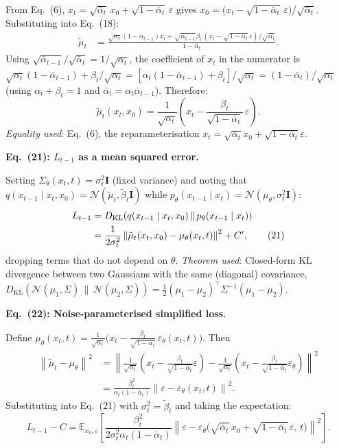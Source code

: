 \documentclass[11pt]{article}
\newcommand{\E}{\mathbb{E}}
\newcommand{\N}{\mathcal{N}}
\newcommand{\KL}[2]{D_{\mathrm{KL}}\!\left(#1\,\|\,#2\right)}
\newcommand{\norm}[1]{\left\|#1\right\|}
\newcommand{\abar}{\bar{\alpha}}
\newcommand{\epsth}{\varepsilon_\theta}
\begin{document}
From Eq.~(6), $x_t = \sqrt{\abar_t}\,x_0 + \sqrt{1-\abar_t}\,\varepsilon$ gives
$x_0 = \bigl(x_t - \sqrt{1-\abar_t}\,\varepsilon\bigr)/\sqrt{\abar_t}$.
Substituting into Eq.~(18):
\begin{align*}
\tilde\mu_t
&= \frac{\sqrt{\alpha_t}(1-\abar_{t-1})x_t
  + \sqrt{\abar_{t-1}}\beta_t\,(x_t-\sqrt{1-\abar_t}\,\varepsilon)/\sqrt{\abar_t}}
         {1-\abar_t}.
\end{align*}
Using $\sqrt{\abar_{t-1}}/\sqrt{\abar_t} = 1/\sqrt{\alpha_t}$, the coefficient
of $x_t$ in the numerator is
$\sqrt{\alpha_t}(1-\abar_{t-1}) + \beta_t/\sqrt{\alpha_t}
= [\alpha_t(1-\abar_{t-1})+\beta_t]/\sqrt{\alpha_t}
= (1-\abar_t)/\sqrt{\alpha_t}$
(using $\alpha_t+\beta_t=1$ and $\abar_t=\alpha_t\abar_{t-1}$).
Therefore:
\begin{equation}
\tilde\mu_t(x_t,x_0)
= \frac{1}{\sqrt{\alpha_t}}\!\left(
    x_t - \frac{\beta_t}{\sqrt{1-\abar_t}}\,\varepsilon
  \right).
\tag{20}
\end{equation}
\textit{Equality used}: Eq.~(6), the reparameterisation $x_t = \sqrt{\abar_t}x_0 + \sqrt{1-\abar_t}\varepsilon$.

\textbf{Eq.~(21): $L_{t-1}$ as a mean squared error.}

Setting $\Sigma_\theta(x_t,t)=\sigma_t^2\mathbf{I}$ (fixed variance) and noting
that $q(x_{t-1}\mid x_t,x_0)=\N(\tilde\mu_t,\tilde\beta_t\mathbf{I})$ while
$p_\theta(x_{t-1}\mid x_t)=\N(\mu_\theta,\sigma_t^2\mathbf{I})$:
\begin{align}
L_{t-1}
&= \KL{q(x_{t-1}\mid x_t,x_0)}{p_\theta(x_{t-1}\mid x_t)} \notag\\
&= \frac{1}{2\sigma_t^2}\norm{\tilde\mu_t(x_t,x_0)-\mu_\theta(x_t,t)}^2
  +C', \tag{21}
\end{align}
dropping terms that do not depend on $\theta$.
\textit{Theorem used}: Closed-form KL divergence between two Gaussians with the same
(diagonal) covariance,
$\KL{\N(\mu_1,\Sigma)}{\N(\mu_2,\Sigma)}=\tfrac{1}{2}(\mu_1-\mu_2)^\top\Sigma^{-1}(\mu_1-\mu_2)$.

\textbf{Eq.~(22): Noise-parameterised simplified loss.}

Define $\mu_\theta(x_t,t) = \frac{1}{\sqrt{\alpha_t}}\bigl(x_t
- \frac{\beta_t}{\sqrt{1-\abar_t}}\,\epsth(x_t,t)\bigr)$.
Then
\begin{align*}
\norm{\tilde\mu_t - \mu_\theta}^2
&= \norm{
    \frac{1}{\sqrt{\alpha_t}}\!\left(x_t-\frac{\beta_t}{\sqrt{1-\abar_t}}\varepsilon\right)
   -\frac{1}{\sqrt{\alpha_t}}\!\left(x_t-\frac{\beta_t}{\sqrt{1-\abar_t}}\epsth\right)
   }^2\\
&= \frac{\beta_t^2}{\alpha_t(1-\abar_t)}\norm{\varepsilon-\epsth(x_t,t)}^2.
\end{align*}
Substituting into Eq.~(21) with $\sigma_t^2=\tilde\beta_t$ and taking the expectation:
\begin{equation}
L_{t-1} - C
= \E_{x_0,\varepsilon}\!\left[
    \frac{\beta_t^2}{2\sigma_t^2\alpha_t(1-\abar_t)}
    \norm{\varepsilon - \epsth\!\bigl(\sqrt{\abar_t}\,x_0+\sqrt{1-\abar_t}\,\varepsilon,\,t\bigr)}^2
  \right]. \tag{22}
\end{equation}
\end{document}
